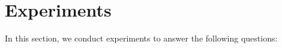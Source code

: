 \documentclass[a4paper,fleqn]{cas-dc}
\begin{document}
\begin{comment}
In this study, we focus on the point cloud segmentation task. To this end, we construct DU-Net, a dedicated network that improves the segmentation by learning to enhance/suppress edges. The overview of the architecture is shown in Fig.~\ref{fig: arch} (top). As can be seen, the network consists of two major components: an encoder and the DU-decoder. 

The encoder is responsible for hierarchical feature abstraction. In each encoder stage, input point features are transformed by certain functions and subsequently downsampled. The downsampling ensures an efficient encoding of multi-resolution characteristics, leading to a more discriminative feature representation. After downsampling, point features are passed to the next stage. 
We select KPConv~\cite{thomas2019kpconv} as the encoder for its excellent performance. Note that we use the depthwise~\cite{sifre2014rigid} version of KPConv except in the first stage to reduce the overall complexity. The comparison of different encoders is presented in Section~\ref{sec: design}. For downsampling, we adopt the farthest point sampling~\cite{qi2017pointnet++}, a widely adopted downsampling method in point cloud analysis.    

We design DU-decoder to improve segmentation by learning to enhance/suppress edges. As illustrated in Fig.~\ref{fig: arch} (top right), the DU-decoder is an alternate application of upsampling and DU. The DU-decoder reverses the process of the encoder by performing upsampling stage by stage. An upsampling layer receives the output of the previous layer and recovers the resolution which matches the resolution of points in the adjacent upper stage of the encoder. To assist usampling of features, we adopt U-Net--style skip connection~\cite{ronneberger2015u}. The upsampled feature is subsequently processed by DU. Through adaptively enhancing/suppressing edges, DU refines the features such that the resulting representation is more accurate and faithful to the ground truth. A DU is applied to each stage so that the features of different resolutions remain discriminative throughout the forward propagation.           
\end{comment}











\section{Experiments}
\label{sec: exp}
In this section, we conduct experiments to answer the following questions:
\end{document}
